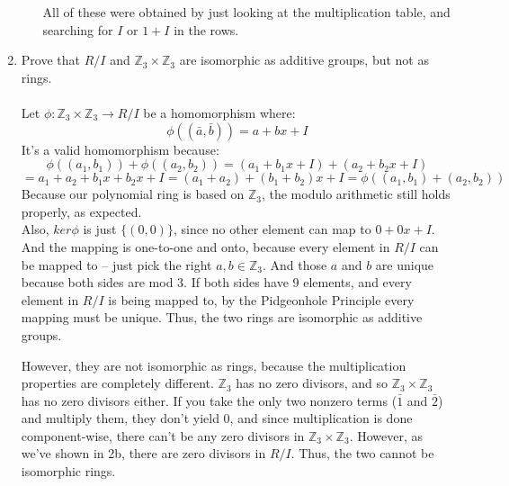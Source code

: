 \begin{enumerate}
\begin{enumerate}
         All of these were obtained by just looking at the multiplication table, and searching for $I$ or $1+I$ in the rows.
         
      \end{enumerate}

    \item Prove that $R/I$ and $\mathds{Z}_3 \times \mathds{Z}_3$ are isomorphic as additive groups, but not as rings.\\\\

      Let $\phi:\mathds{Z}_3 \times \mathds{Z}_3 \rightarrow R/I$ be a homomorphism where:
      $$\phi((\bar{a}, \bar{b})) = a+bx+I$$
      It's a valid homomorphism because:
      $$\phi((a_1,b_1)) + \phi((a_2,b_2)) = (a_1+b_1x+I) + (a_2+b_2x+I)$$
      $$=a_1+a_2+b_1x+b_2x + I = (a_1+a_2) + (b_1+b_2)x + I = \phi( (a_1,b_1) + (a_2,b_2) )$$
      Because our polynomial ring is based on $\mathds{Z}_3$, the modulo arithmetic still holds properly, as expected.\\
      
      Also, $ker \phi$ is just $\{ (0,0) \}$, since no other element can map to $0+0x+I$. And the mapping is one-to-one and onto, because every element in $R/I$ can be mapped to -- just pick the right $a,b \in \mathds{Z}_3$. And those $a$ and $b$ are unique because both sides are mod 3. If both sides have 9 elements, and every element in $R/I$ is being mapped to, by the Pidgeonhole Principle every mapping must be unique. Thus, the two rings are isomorphic as additive groups.

      However, they are not isomorphic as rings, because the multiplication properties are completely different. $\mathds{Z}_3$ has no zero divisors, and so $\mathds{Z}_3 \times \mathds{Z}_3$ has no zero divisors either. If you take the only two nonzero terms ($\bar{1}$ and $\bar{2}$) and multiply them, they don't yield 0, and since multiplication is done component-wise, there can't be any zero divisors in $\mathds{Z}_3 \times \mathds{Z}_3$. However, as we've shown in 2b, there are zero divisors in $R/I$. Thus, the two cannot be isomorphic rings.
\end{enumerate}

